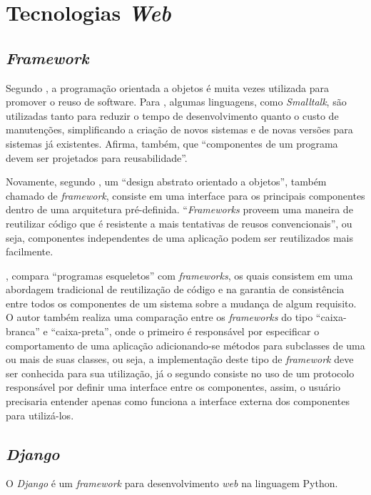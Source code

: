 \chapter{Tecnologias \textit{Web}}

\section{\textit{Framework}}
Segundo , a programação orientada a objetos é muita vezes utilizada para promover o reuso de software. Para , algumas linguagens, como \textit{Smalltalk}, são utilizadas tanto para reduzir o tempo de desenvolvimento quanto o custo de manutenções, simplificando a criação de novos sistemas e de novas versões para sistemas já existentes. Afirma, também, que “componentes de um programa devem ser projetados para reusabilidade”.

Novamente, segundo , um “design abstrato orientado a objetos”, também chamado de \textit{framework}, consiste em uma interface para os principais componentes dentro de uma
arquitetura pré-definida. “\textit{Frameworks} proveem uma maneira de reutilizar código que é resistente a mais tentativas de reusos convencionais”, ou seja, componentes independentes de uma aplicação podem ser reutilizados mais facilmente.

, compara “programas esqueletos” com \textit{frameworks}, os quais consistem em uma abordagem tradicional de reutilização de código e na garantia de consistência entre todos os componentes de um sistema sobre a mudança de algum requisito. O autor também realiza uma comparação entre os \textit{frameworks} do tipo “caixa-branca” e “caixa-preta”, onde o primeiro é responsável por especificar o comportamento de uma aplicação adicionando-se métodos para subclasses de uma ou mais de suas classes, ou seja, a implementação deste tipo de \textit{framework} deve ser conhecida para sua utilização, já o segundo consiste no uso de um protocolo responsável por definir uma interface entre os componentes, assim, o usuário precisaria entender apenas como funciona a interface externa dos componentes para utilizá-los.

\section{\textit{Django}}
O \textit{Django} é um \textit{framework} para desenvolvimento \textit{web} na linguagem Python.

